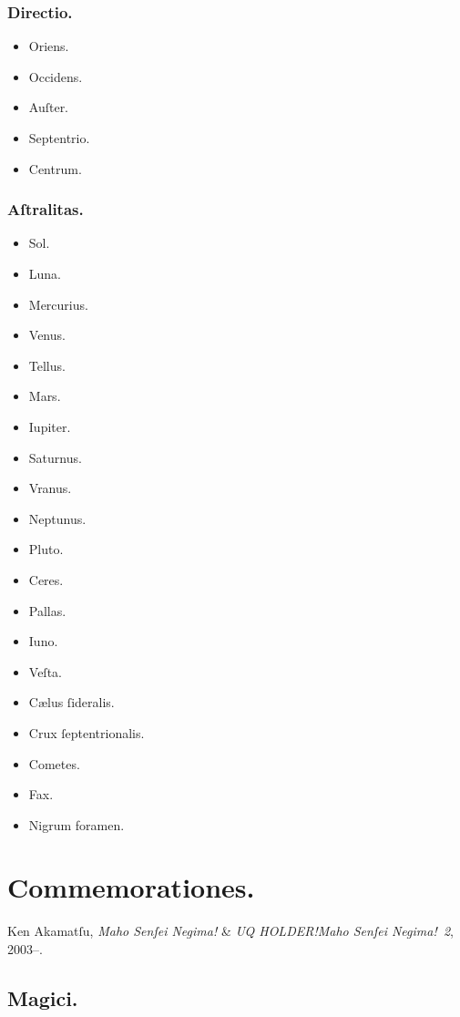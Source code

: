 \documentclass[12pt]{book}
\newcommand{\bookname}[1]{\textenglish{\emph{#1}}}
\begin{document}
\subsection{Directio.}\label{directio}

\begin{itemize}
  \item Oriens.
  \item Occidens.
  \item Auſter.
  \item Septentrio.
  \item Centrum.
\end{itemize}

\subsection{Aſtralitas.}\label{astralitas}

\begin{itemize}
  \item Sol.
  \item Luna.
  \item Mercurius.
  \item Venus.
  \item Tellus.
  \item Mars.
  \item Iupiter.
  \item Saturnus.
  \item Vranus.
  \item Neptunus.
  \item Pluto.
  \item Ceres.
  \item Pallas.
  \item Iuno.
  \item Veſta.
  \item Cælus ſideralis.
  \item Crux ſeptentrionalis.
  \item Cometes.
  \item Fax.
  \item Nigrum foramen.
\end{itemize}


\backmatter
\chapter{Commemorationes.}\label{sources}
Ken Akamatſu, \bookname{Maho Senſei Negima!} \& \bookname{UQ HOLDER!\@ Maho Senſei Negima!~2}, 2003--.

\section*{Magici.}\label{source-magia}
\end{document}
